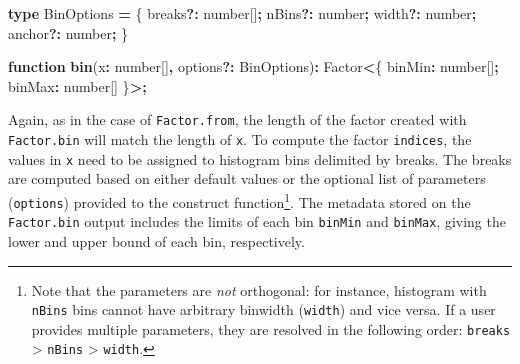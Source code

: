 \documentclass[
  openany]{book}
\newenvironment{Shaded}{\begin{snugshade}}{\end{snugshade}}
\newcommand{\DataTypeTok}[1]{\textcolor[rgb]{0.13,0.29,0.53}{#1}}
\newcommand{\FunctionTok}[1]{\textcolor[rgb]{0.13,0.29,0.53}{\textbf{#1}}}
\newcommand{\KeywordTok}[1]{\textcolor[rgb]{0.13,0.29,0.53}{\textbf{#1}}}
\newcommand{\NormalTok}[1]{#1}
\newcommand{\OperatorTok}[1]{\textcolor[rgb]{0.81,0.36,0.00}{\textbf{#1}}}
\theoremstyle{definition}
\theoremstyle{definition}
\theoremstyle{definition}
\theoremstyle{definition}
\theoremstyle{remark}
\begin{document}
\begin{Shaded}
\begin{Highlighting}[]
\KeywordTok{type}\NormalTok{ BinOptions }\OperatorTok{=}\NormalTok{ \{ }
\NormalTok{  breaks}\OperatorTok{?:} \DataTypeTok{number}\NormalTok{[]}\OperatorTok{;} 
\NormalTok{  nBins}\OperatorTok{?:} \DataTypeTok{number}\OperatorTok{;} 
\NormalTok{  width}\OperatorTok{?:} \DataTypeTok{number}\OperatorTok{;} 
\NormalTok{  anchor}\OperatorTok{?:} \DataTypeTok{number}\OperatorTok{;} 
\NormalTok{\}}

\KeywordTok{function} \FunctionTok{bin}\NormalTok{(x}\OperatorTok{:} \DataTypeTok{number}\NormalTok{[]}\OperatorTok{,}\NormalTok{ options}\OperatorTok{?:}\NormalTok{ BinOptions)}\OperatorTok{:} 
\NormalTok{  Factor}\OperatorTok{\textless{}}\NormalTok{\{ binMin}\OperatorTok{:} \DataTypeTok{number}\NormalTok{[]}\OperatorTok{;}\NormalTok{ binMax}\OperatorTok{:} \DataTypeTok{number}\NormalTok{[] \}}\OperatorTok{\textgreater{};}
\end{Highlighting}
\end{Shaded}

Again, as in the case of \texttt{Factor.from}, the length of the factor created with \texttt{Factor.bin} will match the length of \texttt{x}. To compute the factor \texttt{indices}, the values in \texttt{x} need to be assigned to histogram bins delimited by breaks. The breaks are computed based on either default values or the optional list of parameters (\texttt{options}) provided to the construct function\footnote{Note that the parameters are \emph{not} orthogonal: for instance, histogram with \texttt{nBins} bins cannot have arbitrary binwidth (\texttt{width}) and vice versa. If a user provides multiple parameters, they are resolved in the following order: \texttt{breaks} \textgreater{} \texttt{nBins} \textgreater{} \texttt{width}.}. The metadata stored on the \texttt{Factor.bin} output includes the limits of each bin \texttt{binMin} and \texttt{binMax}, giving the lower and upper bound of each bin, respectively.
\end{document}

